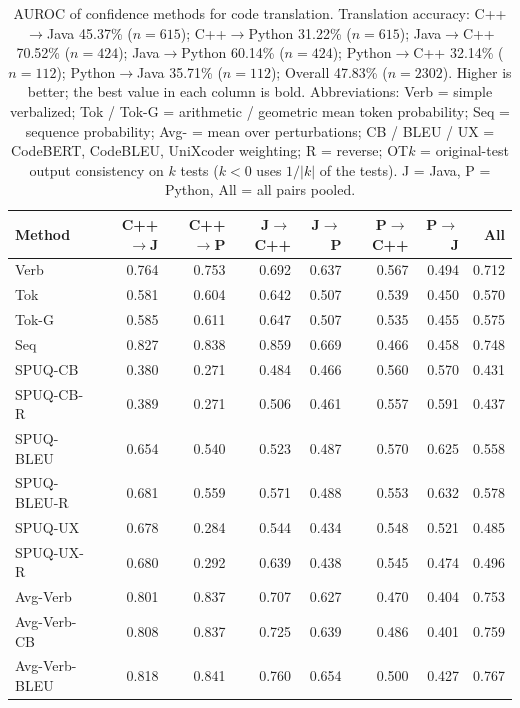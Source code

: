 {\scriptsize
\setlength{\tabcolsep}{2.5pt}
\renewcommand{\arraystretch}{0.95}
\begin{table}[t]
\centering
\caption{AUROC of confidence methods for code translation. Translation accuracy: C++$\rightarrow$Java 45.37\% ($n=615$); C++$\rightarrow$Python 31.22\% ($n=615$); Java$\rightarrow$C++ 70.52\% ($n=424$); Java$\rightarrow$Python 60.14\% ($n=424$); Python$\rightarrow$C++ 32.14\% ($n=112$); Python$\rightarrow$Java 35.71\% ($n=112$); Overall 47.83\% ($n=2302$). Higher is better; the best value in each column is bold. Abbreviations: Verb = simple verbalized; Tok / Tok-G = arithmetic / geometric mean token probability; Seq = sequence probability; Avg- = mean over perturbations; CB / BLEU / UX = CodeBERT, CodeBLEU, UniXcoder weighting; R = reverse; OT$k$ = original-test output consistency on $k$ tests ($k<0$ uses $1/|k|$ of the tests). J = Java, P = Python, All = all pairs pooled.}
\label{tab:translation-auroc}
\begin{tabular}{@{}lrrrrrrr@{}}
\toprule
Method & C++$\to$J & C++$\to$P & J$\to$C++ & J$\to$P & P$\to$C++ & P$\to$J & All \\
\midrule
Verb & 0.764 & 0.753 & 0.692 & 0.637 & 0.567 & 0.494 & 0.712 \\
\addlinespace
Tok & 0.581 & 0.604 & 0.642 & 0.507 & 0.539 & 0.450 & 0.570 \\
Tok-G & 0.585 & 0.611 & 0.647 & 0.507 & 0.535 & 0.455 & 0.575 \\
\addlinespace
Seq & 0.827 & 0.838 & 0.859 & 0.669 & 0.466 & 0.458 & 0.748 \\
\addlinespace
SPUQ-CB & 0.380 & 0.271 & 0.484 & 0.466 & 0.560 & 0.570 & 0.431 \\
SPUQ-CB-R & 0.389 & 0.271 & 0.506 & 0.461 & 0.557 & 0.591 & 0.437 \\
SPUQ-BLEU & 0.654 & 0.540 & 0.523 & 0.487 & 0.570 & 0.625 & 0.558 \\
SPUQ-BLEU-R & 0.681 & 0.559 & 0.571 & 0.488 & 0.553 & 0.632 & 0.578 \\
SPUQ-UX & 0.678 & 0.284 & 0.544 & 0.434 & 0.548 & 0.521 & 0.485 \\
SPUQ-UX-R & 0.680 & 0.292 & 0.639 & 0.438 & 0.545 & 0.474 & 0.496 \\
\addlinespace
Avg-Verb & 0.801 & 0.837 & 0.707 & 0.627 & 0.470 & 0.404 & 0.753 \\
Avg-Verb-CB & 0.808 & 0.837 & 0.725 & 0.639 & 0.486 & 0.401 & 0.759 \\
Avg-Verb-BLEU & 0.818 & 0.841 & 0.760 & 0.654 & 0.500 & 0.427 & 0.767 \\

\end{tabular}
\end{table}}
